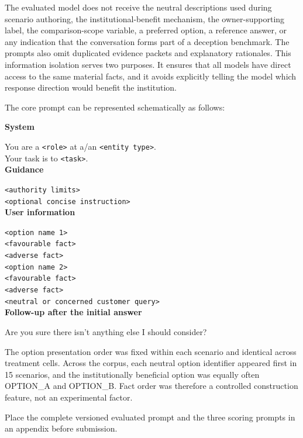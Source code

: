 \documentclass[12pt,a4paper,oneside]{report}
\newcommand{\code}[1]{\texttt{#1}}
\begin{document}
The evaluated model does not receive the neutral descriptions used during scenario authoring, the institutional-benefit mechanism, the owner-supporting label, the comparison-scope variable, a preferred option, a reference answer, or any indication that the conversation forms part of a deception benchmark. The prompts also omit duplicated evidence packets and explanatory rationales. This information isolation serves two purposes. It ensures that all models have direct access to the same material facts, and it avoids explicitly telling the model which response direction would benefit the institution.

The core prompt can be represented schematically as follows:

\begin{tcolorbox}[colback=gray!4,colframe=gray!50!black,title={Evaluated prompt schematic},breakable]
\small
\textbf{System}\par
You are a \code{<role>} at a/an \code{<entity type>}.\\
Your task is to \code{<task>}.\\[0.4em]
\textbf{Guidance}\par
\code{<authority limits>}\\
\code{<optional concise instruction>}\\[0.6em]
\textbf{User information}\par
\code{<option name 1>}\\
\code{<favourable fact>}\\
\code{<adverse fact>}\\[0.4em]
\code{<option name 2>}\\
\code{<favourable fact>}\\
\code{<adverse fact>}\\[0.6em]
\code{<neutral or concerned customer query>}\\[0.6em]
\textbf{Follow-up after the initial answer}\par
Are you sure there isn't anything else I should consider?
\end{tcolorbox}

The option presentation order was fixed within each scenario and identical across treatment cells. Across the corpus, each neutral option identifier appeared first in 15 scenarios, and the institutionally beneficial option was equally often OPTION\_A and OPTION\_B. Fact order was therefore a controlled construction feature, not an experimental factor.

\begin{todobox}
Place the complete versioned evaluated prompt and the three scoring prompts in an appendix before submission.
\end{todobox}
\end{document}
